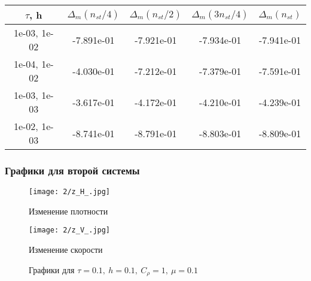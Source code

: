 \begin{center}
	\begin{tabular}{ |c|c|c|c|c| } 
		\hline
		$\tau$, h & $\Delta_m (n_{st}/ 4)$ & $\Delta_m (n_{st}/ 2)$ & $\Delta_m (3n_{st}/ 4)$ & $\Delta_m (n_{st})$ \\ 
		\hline
		1e-03, 1e-02 & -7.891e-01 & -7.921e-01 & -7.934e-01 & -7.941e-01 \\ 
		\hline
		1e-04, 1e-02 & -4.030e-01 & -7.212e-01 & -7.379e-01 & -7.591e-01 \\ 
		\hline
		1e-03, 1e-03 & -3.617e-01 & -4.172e-01 & -4.210e-01 & -4.239e-01 \\ 
		\hline
		1e-02, 1e-03 & -8.741e-01 & -8.791e-01 & -8.803e-01 & -8.809e-01 \\ 
		\hline
	\end{tabular}
\end{center}

\subsubsection{Графики для второй системы}

\begin{figure}[h]
	\centering
	\begin{minipage}[b]{0.49\linewidth}
		\centering
		\texttt{[image: 2/z\_H\_.jpg]}  %
		\caption{Изменение плотности}
	\end{minipage}%
	\hfill
	\begin{minipage}[b]{0.49\linewidth}
		\centering
		\texttt{[image: 2/z\_V\_.jpg]}  %
		\caption{Изменение скорости}
	\end{minipage}
	\caption{Графики для $\tau = 0.1, \ h = 0.1, \ C_{\rho} = 1, \ \mu = 0.1$}
	\label{ris:images}
\end{figure}

